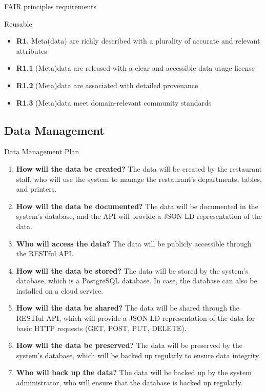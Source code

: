 \begin{frame}[allowframebreaks]{FAIR\autocite{Wilkinson_2016} principles requirements}
	\begin{block}{Reusable}
		\begin{itemize}
			\item \textbf{R1.} Meta(data) are richly described with a plurality of accurate and relevant attributes
			\item \textbf{R1.1} (Meta)data are released with a clear and accessible data usage license
			\item \textcolor{UNITSCherry}{\textbf{R1.2} (Meta)data are associated with detailed provenance}
			\item \textcolor{UNITSCherry}{\textbf{R1.3} (Meta)data meet domain-relevant community standards}
		\end{itemize}
	\end{block}
\end{frame}


\subsection[Data Management]{Data Management}

\begin{frame}[allowframebreaks]{Data Management Plan}

	\begin{enumerate}
		\item \textbf{How will the data be created?} The data will be created by the
		      restaurant staff, who will use the system to manage the restaurant's
		      departments, tables, and printers.
		\item \textbf{How will the data be documented?} The data will be documented in
		      the system's database, and the API will provide a JSON-LD representation of
		      the data.
		\item \textbf{Who will access the data?} The data will be publicly accessible
		      through the RESTful API.
		\item \textbf{How will the data be stored?} The data will be stored by the
		      system's database, which is a PostgreSQL database. In case, the database
			  can also be installed on a cloud service.
		\item \textbf{How will the data be shared?} The data will be shared through the
		      RESTful API, which will provide a JSON-LD representation of the data for
			  basic HTTP requests (GET, POST, PUT, DELETE).
		\item \textbf{How will the data be preserved?} The data will be preserved by
		      the system's database, which will be backed up regularly to ensure data
			  integrity.
		\item \textbf{Who will back up the data?} The data will be backed up by the
		      system administrator, who will ensure that the database is backed up
			  regularly.
	\end{enumerate}
\end{frame}
